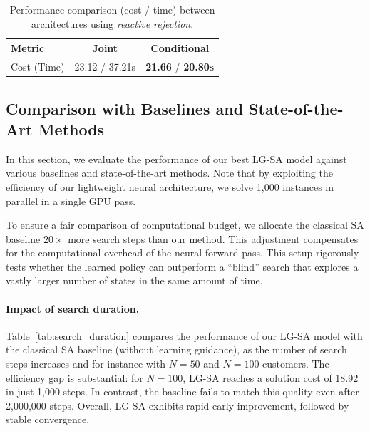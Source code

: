 \documentclass[letterpaper]{article} %
\begin{document}
\begin{table}[t]
\centering
\small
\begin{tabular}{l c c}
\toprule
Metric & Joint & Conditional \\
\midrule
Cost (Time) & 23.12 / 37.21s & \textbf{21.66} / \textbf{20.80s} \\
\bottomrule
\end{tabular}
\caption{Performance comparison (cost / time) between architectures using \textit{reactive rejection}.}
\label{tab:joint_vs_cond}
\end{table}




\subsection{Comparison with Baselines and State-of-the-Art Methods}


In this section, we evaluate the performance of our best LG-SA model against various baselines and state-of-the-art methods. Note that by exploiting the efficiency of our lightweight neural architecture, we solve 1{,}000 instances in parallel in a single GPU pass.

To ensure a fair comparison of computational budget, we allocate the classical SA baseline $20\times$ more search steps than our method. This adjustment compensates for the computational overhead of the neural forward pass. This setup rigorously tests whether the learned policy can outperform a ``blind'' search that explores a vastly larger number of states in the same amount of time.



\paragraph{Impact of search duration.}
Table~\ref{tab:search_duration} compares the performance of our LG-SA model with the classical SA baseline (without learning guidance), as the number of search steps increases and for instance with $N=50$ and $N=100$ customers. The efficiency gap is substantial: for $N=100$, LG-SA reaches a solution cost of 18.92 in just 1{,}000 steps. In contrast, the baseline fails to match this quality even after 2{,}000{,}000 steps. Overall, LG-SA exhibits rapid early improvement, followed by stable convergence.
\end{document}
